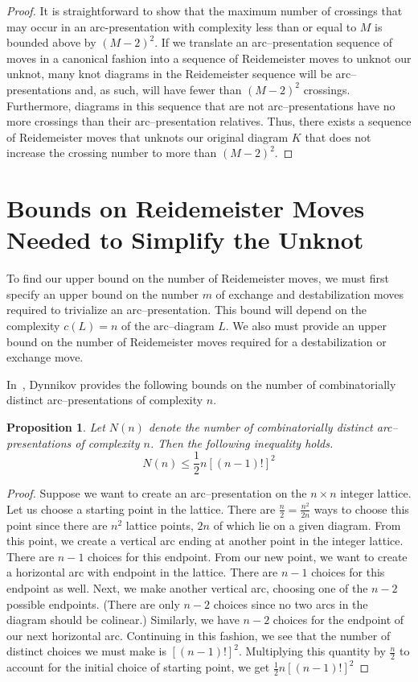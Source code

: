 \documentclass{amsart}
\newtheorem{proposition}[theorem]{Proposition}
\begin{document}
\begin{proof}
It is straightforward to show that the maximum number of crossings that may occur in an arc-presentation with complexity less than or equal to $M$ is bounded above by $(M-2)^2$. If we translate an arc--presentation sequence of moves in a canonical fashion into a sequence of Reidemeister moves to unknot our unknot, many knot diagrams in the Reidemeister sequence will be arc--presentations and, as such, will have fewer than $(M-2)^2$ crossings. Furthermore, diagrams in this sequence that are not arc--presentations have no more crossings than their arc--presentation relatives. Thus, there exists a sequence of Reidemeister moves that unknots our original diagram $K$ that does not increase the crossing number to more than $(M-2)^2.$
\end{proof}

\section{Bounds on Reidemeister Moves Needed to Simplify the Unknot}


To find our upper bound on the number of Reidemeister moves, we must first specify an upper bound on the number $m$ of exchange and destabilization moves required to trivialize an arc--presentation. This bound will depend on the complexity $c(L)=n$ of the arc--diagram $L$. We also must provide an upper bound on the number of Reidemeister moves required for a destabilization or exchange move.

In~\cite{dynnikov}, Dynnikov provides the following bounds on the number of combinatorially distinct arc--presentations of complexity $n$. 

\begin{proposition} Let $N(n)$ denote the number of combinatorially distinct arc-- presentations of complexity $n$. Then the following inequality holds.
$$N(n)\leq \frac{1}{2}n [(n-1)!]^2$$
\end{proposition}

\begin{proof}
Suppose we want to create an arc--presentation on the $n\times n$ integer lattice. Let us choose a starting point in the lattice. There are $\frac{n}{2}=\frac{n^2}{2n}$ ways to choose this point since there are $n^2$ lattice points, $2n$ of which lie on a given diagram. From this point, we create a vertical arc ending at another point in the integer lattice. There are $n-1$ choices for this endpoint. From our new point, we want to create a horizontal arc with endpoint in the lattice. There are $n-1$ choices for this endpoint as well. Next, we make another vertical arc, choosing one of the $n-2$ possible endpoints. (There are only $n-2$ choices since no two arcs in the diagram should be colinear.) Similarly, we have $n-2$ choices for the endpoint of our next horizontal arc. Continuing in this fashion, we see that the number of distinct choices we must make is $[(n-1)!]^2$.
Multiplying this quantity by $\frac{n}{2}$ to account for the initial choice of starting point, we get $\frac{1}{2}n[(n-1)!]^2$
\end{proof}
\end{document}
